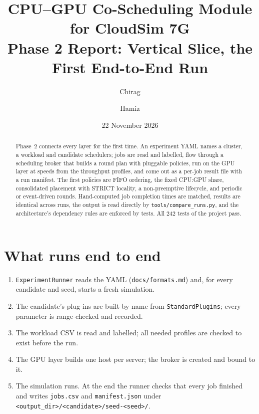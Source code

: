 \documentclass[11pt,a4paper]{article}
\title{CPU--GPU Co-Scheduling Module for CloudSim 7G\\[4pt]
\large Phase 2 Report: Vertical Slice, the First End-to-End Run}
\author{Chirag \and Hamiz}
\date{22 November 2026}
\newcommand{\code}[1]{\texttt{#1}}
\begin{document}
\maketitle

\begin{abstract}
Phase~2 connects every layer for the first time. An experiment YAML names a cluster, a workload and
candidate schedulers; jobs are read and labelled, flow through a scheduling broker that builds a
round plan with pluggable policies, run on the GPU layer at speeds from the throughput profiles, and
come out as a per-job result file with a run manifest. The first policies are FIFO ordering, the
fixed CPU:GPU share, consolidated placement with STRICT locality, a non-preemptive lifecycle, and
periodic or event-driven rounds. Hand-computed job completion times are matched, results are
identical across runs, the output is read directly by \code{tools/compare\_runs.py}, and the
architecture's dependency rules are enforced by tests. All 242 tests of the project pass.
\end{abstract}

\tableofcontents

\section{What runs end to end}

\begin{enumerate}
  \item \code{ExperimentRunner} reads the YAML (\code{docs/formats.md}) and, for every candidate and
        seed, starts a fresh simulation.
  \item The candidate's plug-ins are built by name from \code{StandardPlugins}; every parameter is
        range-checked and recorded.
  \item The workload CSV is read and labelled; all needed profiles are checked to exist before the run.
  \item The GPU layer builds one host per server; the broker is created and bound to it.
  \item The simulation runs. At the end the runner checks that every job finished and writes
        \code{jobs.csv} and \code{manifest.json} under \code{<output\_dir>/<candidate>/seed-<seed>/}.
\end{enumerate}

\end{document}
